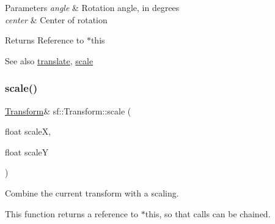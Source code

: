 \begin{DoxyParams}{Parameters}
{\em angle} & Rotation angle, in degrees \\
\hline
{\em center} & Center of rotation\\
\hline
\end{DoxyParams}
\begin{DoxyReturn}{Returns}
Reference to $\ast$this
\end{DoxyReturn}
\begin{DoxySeeAlso}{See also}
\mbox{\hyperlink{classsf_1_1_transform_ab54f6c8070cc05e2afcb3145fbf4395a}{translate}}, \mbox{\hyperlink{classsf_1_1_transform_a3f46af807f69d74120fb836334268671}{scale}} \begin{DoxyVerb}\end{DoxyVerb}
 
\end{DoxySeeAlso}
\mbox{\label{classsf_1_1_transform_a3f46af807f69d74120fb836334268671}} 
\subsubsection{\texorpdfstring{scale()}{scale()}\hspace{0.1cm}{\footnotesize\ttfamily [1/4]}}
{\footnotesize\ttfamily \mbox{\hyperlink{classsf_1_1_transform}{Transform}}\& sf\+::\+Transform\+::scale (\begin{DoxyParamCaption}\item[{float}]{scaleX,  }\item[{float}]{scaleY }\end{DoxyParamCaption})}



Combine the current transform with a scaling. 

This function returns a reference to $\ast$this, so that calls can be chained. 
\begin{DoxyCode}{0}
\end{DoxyCode}



